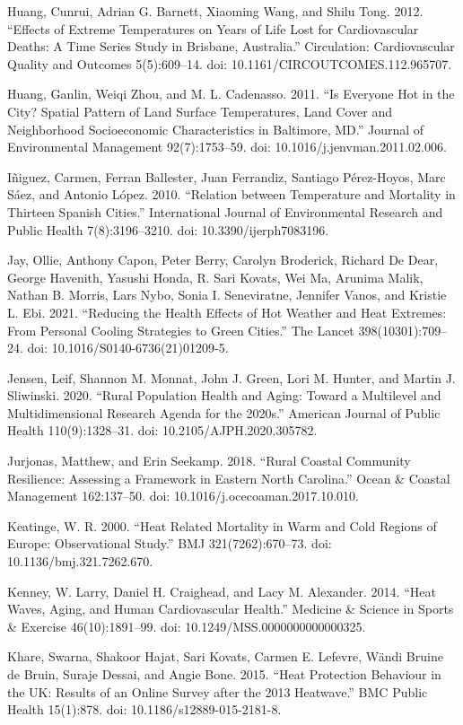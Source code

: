 \documentclass[12pt]{article}
\begin{document}
Huang, Cunrui, Adrian G. Barnett, Xiaoming Wang, and Shilu Tong. 2012.
``Effects of Extreme Temperatures on Years of Life Lost for
Cardiovascular Deaths: A Time Series Study in Brisbane, Australia.''
Circulation: Cardiovascular Quality and Outcomes 5(5):609--14. doi:
10.1161/CIRCOUTCOMES.112.965707.

Huang, Ganlin, Weiqi Zhou, and M. L. Cadenasso. 2011. ``Is Everyone Hot
in the City? Spatial Pattern of Land Surface Temperatures, Land Cover
and Neighborhood Socioeconomic Characteristics in Baltimore, MD.''
Journal of Environmental Management 92(7):1753--59. doi:
10.1016/j.jenvman.2011.02.006.

Iñiguez, Carmen, Ferran Ballester, Juan Ferrandiz, Santiago Pérez-Hoyos,
Marc Sáez, and Antonio López. 2010. ``Relation between Temperature and
Mortality in Thirteen Spanish Cities.'' International Journal of
Environmental Research and Public Health 7(8):3196--3210. doi:
10.3390/ijerph7083196.

Jay, Ollie, Anthony Capon, Peter Berry, Carolyn Broderick, Richard De
Dear, George Havenith, Yasushi Honda, R. Sari Kovats, Wei Ma, Arunima
Malik, Nathan B. Morris, Lars Nybo, Sonia I. Seneviratne, Jennifer
Vanos, and Kristie L. Ebi. 2021. ``Reducing the Health Effects of Hot
Weather and Heat Extremes: From Personal Cooling Strategies to Green
Cities.'' The Lancet 398(10301):709--24. doi:
10.1016/S0140-6736(21)01209-5.

Jensen, Leif, Shannon M. Monnat, John J. Green, Lori M. Hunter, and
Martin J. Sliwinski. 2020. ``Rural Population Health and Aging: Toward a
Multilevel and Multidimensional Research Agenda for the 2020s.''
American Journal of Public Health 110(9):1328--31. doi:
10.2105/AJPH.2020.305782.

Jurjonas, Matthew, and Erin Seekamp. 2018. ``Rural Coastal Community
Resilience: Assessing a Framework in Eastern North Carolina.'' Ocean \&
Coastal Management 162:137--50. doi: 10.1016/j.ocecoaman.2017.10.010.

Keatinge, W. R. 2000. ``Heat Related Mortality in Warm and Cold Regions
of Europe: Observational Study.'' BMJ 321(7262):670--73. doi:
10.1136/bmj.321.7262.670.

Kenney, W. Larry, Daniel H. Craighead, and Lacy M. Alexander. 2014.
``Heat Waves, Aging, and Human Cardiovascular Health.'' Medicine \&
Science in Sports \& Exercise 46(10):1891--99. doi:
10.1249/MSS.0000000000000325.

Khare, Swarna, Shakoor Hajat, Sari Kovats, Carmen E. Lefevre, Wändi
Bruine de Bruin, Suraje Dessai, and Angie Bone. 2015. ``Heat Protection
Behaviour in the UK: Results of an Online Survey after the 2013
Heatwave.'' BMC Public Health 15(1):878. doi: 10.1186/s12889-015-2181-8.
\end{document}
